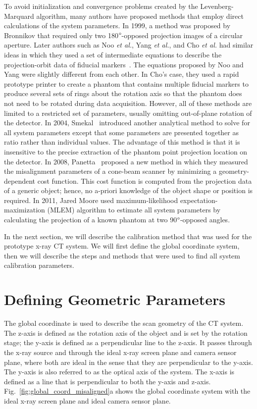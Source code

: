 To avoid initialization and convergence problems created by the Levenberg-Marquard algorithm, many authors have proposed methods that employ direct calculations of the system parameters.  In 1999, a method was proposed by Bronnikov that required only two 180$\degree$-opposed projection images of  a circular aperture.  Later authors such as Noo \textit{et al.}, Yang \textit{et al.}, and Cho \textit{et al.} had similar ideas in which they used a set of intermediate equations to describe the projection-orbit data of fiducial markers~\citep{Noo2000, Yang2006, Cho2005}.  The equations proposed by Noo and Yang were slightly different from each other.  In Cho's case, they used a rapid prototype printer to create a phantom that contains multiple fiducial markers to produce several sets of rings about the rotation axis so that the phantom does not need to be rotated during data acquisition.  However, all of these methods are limited to a restricted set of parameters, usually omitting out-of-plane rotation of the detector.  In 2004, Smekal~\citep{Smekal2004} introduced another analytical method to solve for all system parameters except that some parameters are presented together as ratio rather than individual values.  The advantage of this method is that it is insensitive to the precise extraction of the phantom point projection location on the detector.  In 2008, Panetta~\citep{Panetta2008} proposed a new method in which they measured the misalignment parameters of a cone-beam scanner by minimizing a geometry-dependent cost function.  This cost function is computed from the projection data of a generic object; hence, no a-priori knowledge of the object shape or position is required.  In 2011, Jared Moore used maximum-likelihood expectation-maximization (MLEM) algorithm to estimate all system parameters by calculating the projection of a known phantom at two 90$\degree$-opposed angles.

In the next section, we will describe the calibration method that was used for the prototype x-ray CT system.  We will first define the global coordinate system, then we will describe the steps and methods that were used to find all system calibration parameters.

\section{Defining Geometric Parameters}
The global coordinate is used to describe the scan geometry of the CT system.  The z-axis is defined as the rotation axis of the object and is set by the rotation stage; the y-axis is defined as a perpendicular line to the z-axis.  It passes through the x-ray source and through the ideal x-ray screen plane and camera sensor plane, where both are ideal in the sense that they are perpendicular to the y-axis.  The y-axis is also referred to as the optical axis of the system.  The x-axis is defined as a line that is perpendicular to both the y-axis and z-axis.  Fig.~\ref{fig:global_coord_misaligned}a shows the global coordinate system with the ideal x-ray screen plane and ideal camera sensor plane.  

